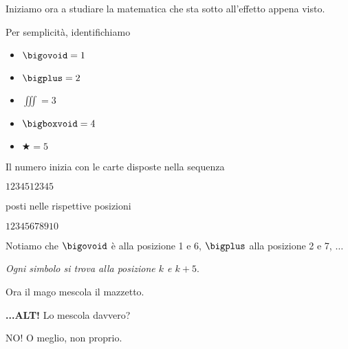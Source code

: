 \documentclass[8pt]{beamer}
\theoremstyle{plain}
\theoremstyle{definition}
\begin{document}
\begin{frame}
\begin{center}
Iniziamo ora a studiare la matematica che sta sotto all'effetto appena visto.

\medskip
\smallskip

Per semplicità, identifichiamo

\begin{itemize}
\item[]  \begin{center} $\bigovoid = 1$ \end{center}
\item[]  \begin{center} $\bigplus = 2$ \end{center}
\item[]  \begin{center} $\iiint =3$ \end{center}
\item[]  \begin{center} $\bigboxvoid =4$ \end{center} 
\item[] \begin{center} $\bigstar =5$ \end{center} 
\end{itemize}

Il numero inizia con le carte disposte nella sequenza \begin{center}
$1$\quad$2$\quad$3$\quad$4$\quad$5$\quad$1$\quad$2$\quad$3$\quad$4$\quad$5$
\end{center}
posti nelle rispettive posizioni
\begin{center}
$1$\quad$2$\quad$3$\quad$4$\quad$5$\quad$6$\quad$7$\quad$8$\quad$9$\quad$10$
\end{center}

\medskip
\medskip

Notiamo che $\bigovoid$ è alla posizione 1 e 6, $\bigplus$ alla posizione 2 e 7, $\ldots$ 
 
\emph{Ogni simbolo si trova alla posizione $k$ e $k+5$}.
 \end{center}
\end{frame}


\begin{frame}
\begin{center}
 
Ora il mago mescola il mazzetto.

\bigskip
\bigskip
\bigskip

\textbf{...ALT!} Lo mescola davvero?

\medskip
\bigskip

NO! O meglio, non proprio.
\end{center}
\end{frame}
\end{document}
